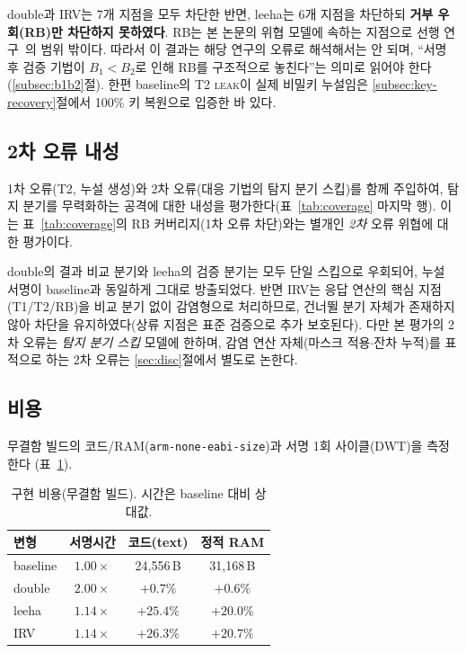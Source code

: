 \textsf{double}과 \textsf{IRV}는 7개 지점을 모두 차단한 반면, \textsf{leeha}는 6개 지점을
차단하되 \textbf{거부 우회(RB)만 차단하지 못하였다}. RB는 본 논문의 위협 모델에 속하는 지점으로
선행 연구~\cite{lee2026haetae}의 범위 밖이다. 따라서 이 결과는 해당 연구의 오류로 해석해서는 안
되며, ``서명 후 검증 기법이 $B_1<B_2$로 인해 RB를 구조적으로 놓친다''는 의미로 읽어야 한다
(\ref{subsec:b1b2}절). 한편 \textsf{baseline}의 T2 \textsc{leak}이 실제 비밀키 누설임은
\ref{subsec:key-recovery}절에서 100\% 키 복원으로 입증한 바 있다.

\subsection{2차 오류 내성}
\label{subsec:2nd}
1차 오류(T2, 누설 생성)와 2차 오류(대응 기법의 탐지 분기 스킵)를 함께 주입하여, 탐지 분기를
무력화하는 공격에 대한 내성을 평가한다(표~\ref{tab:coverage} 마지막 행). 이는 표~\ref{tab:coverage}의
RB 커버리지(1차 오류 차단)와는 별개인 \emph{2차} 오류 위협에 대한 평가이다.

\textsf{double}의 결과 비교 분기와 \textsf{leeha}의 검증 분기는 모두 단일 스킵으로 우회되어, 누설
서명이 \textsf{baseline}과 동일하게 그대로 방출되었다. 반면 IRV는 응답 연산의 핵심 지점(T1/T2/RB)을
비교 분기 없이 감염형으로 처리하므로, 건너뛸 분기 자체가 존재하지 않아 차단을 유지하였다(상류 지점은
표준 검증으로 추가 보호된다). 다만 본 평가의 2차 오류는 \emph{탐지 분기 스킵} 모델에 한하며, 감염 연산
자체(마스크 적용$\cdot$잔차 누적)를 표적으로 하는 2차 오류는 \ref{sec:disc}절에서 별도로 논한다.

\subsection{비용}
\label{subsec:cost}
무결함 빌드의 코드/RAM(\texttt{arm-none-eabi-size})과 서명 1회 사이클(DWT)을 측정한다
(표~\ref{tab:cost}).

\begin{table}[H]\centering
\caption{구현 비용(무결함 빌드). 시간은 baseline 대비 상대값.}
\label{tab:cost}
\small
\begin{tabular}{@{}lccc@{}}
\toprule
변형 & 서명시간 & 코드(text) & 정적 RAM \\
\midrule
baseline       & $1.00\times$ & 24{,}556\,B & 31{,}168\,B \\
\textsf{double}& $2.00\times$ & $+0.7\%$    & $+0.6\%$ \\
\textsf{leeha} & $1.14\times$ & $+25.4\%$   & $+20.0\%$ \\
\textsf{IRV}   & $1.14\times$ & $+26.3\%$   & $+20.7\%$ \\
\bottomrule
\end{tabular}
\end{table}

